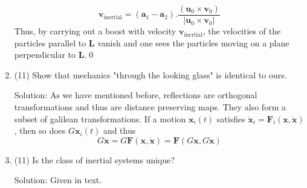 \begin{enumerate}
\begin{equation}
\mathbf{v}_\mathrm{inertial} = 	(\mathbf{a}_1-\mathbf{a}_2).\frac{(\mathbf{u}_0\times\mathbf{v}_0)}{|\mathbf{u}_0\times\mathbf{v}_0|}
\end{equation}
Thus, by carrying out a boost with velocity $ \mathbf{v}_\mathrm{inertial} $, the velocities of the particles parallel to $\mathbf{L}$ vanish and one sees the particles moving on a plane perpendicular to $\mathbf{L}$.\qed
\item (11) Show that mechanics "through the looking glass" is identical
to ours.\par
Solution: As we have mentioned before, reflections are orthogonal transformations and thus are distance preserving maps. They also form a subset of galilean transformations. If a motion $\mathbf{x}_i(t)$ satisfies $\ddot{\mathbf{x}}_i = \mathbf{F}_i(\mathbf{x},\dot{\mathbf{x}})$, then so does $G\mathbf{x}_i(t)$ and thus 
\begin{equation}
	G\ddot{\mathbf{x}} = G \mathbf{F}(\mathbf{x},\dot{\mathbf{x}})=\mathbf{F}(G\mathbf{x},G\dot{\mathbf{x}})
\end{equation}
\item(11) Is the class of inertial systems unique?\par
Solution: Given in text.
	\end{enumerate}
